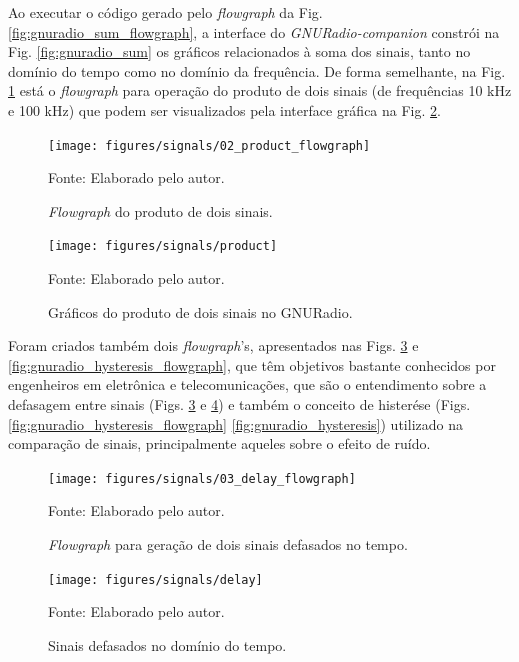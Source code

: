 \documentclass[
  12pt,				%
  openright,			%
  twoside,			%
  a4paper,			%
  english,			%
  french,				%
  spanish,			%
  brazil,				%
  ]{abntex2}
\begin{document}
Ao executar o código gerado pelo \textit{flowgraph} da Fig. \ref{fig:gnuradio_sum_flowgraph}, a interface do \textit{GNURadio-companion} constrói na Fig. \ref{fig:gnuradio_sum} os gráficos
relacionados à soma dos sinais, tanto no domínio do tempo como no domínio da frequência. De forma semelhante, na Fig. \ref{fig:gnuradio_product_flowgraph} está o \textit{flowgraph} para
operação do produto de dois sinais (de frequências 10 kHz e 100 kHz) que podem ser visualizados pela interface gráfica na Fig. \ref{fig:gnuradio_product}.

\begin{figure}[!htb]
  \centering
  \caption{\textit{Flowgraph} do produto de dois sinais.}
  \texttt{[image: figures/signals/02\_product\_flowgraph]}

  Fonte: Elaborado pelo autor.
  \label{fig:gnuradio_product_flowgraph}
\end{figure}

\begin{figure}[!htb]
  \centering
  \caption{Gráficos do produto de dois sinais no GNURadio.}
  \texttt{[image: figures/signals/product]}

  Fonte: Elaborado pelo autor.
  \label{fig:gnuradio_product}
\end{figure}

Foram criados também dois \textit{flowgraph}'s, apresentados nas Figs. \ref{fig:gnuradio_delay_flowgraph} e \ref{fig:gnuradio_hysteresis_flowgraph}, que têm objetivos bastante
conhecidos por engenheiros em eletrônica e telecomunicações, que são o entendimento sobre a defasagem entre sinais (Figs. \ref{fig:gnuradio_delay_flowgraph} e \ref{fig:gnuradio_delay})
e também o conceito de histerése (Figs. \ref{fig:gnuradio_hysteresis_flowgraph}
\ref{fig:gnuradio_hysteresis}) utilizado na comparação de sinais, principalmente aqueles sobre o efeito de ruído.


\begin{figure}[!htb]
  \centering
  \caption{\textit{Flowgraph} para geração de dois sinais defasados no tempo.}
  \texttt{[image: figures/signals/03\_delay\_flowgraph]}

  Fonte: Elaborado pelo autor.
  \label{fig:gnuradio_delay_flowgraph}
\end{figure}

\begin{figure}[!htb]
  \centering
  \caption{Sinais defasados no domínio do tempo.}
  \texttt{[image: figures/signals/delay]}

  Fonte: Elaborado pelo autor.
  \label{fig:gnuradio_delay}
\end{figure}
\end{document}
